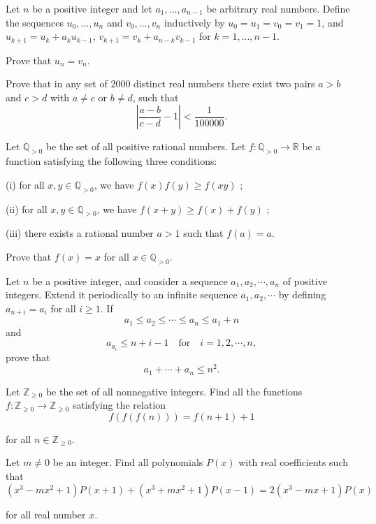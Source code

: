 \item[\textbf{A1.}]
Let 
$n$
 be a positive integer and let 
$a_1, \ldots, a_{n-1} $
 be arbitrary real numbers. Define the sequences 
$u_0, \ldots, u_n $
 and 
$v_0, \ldots, v_n $
 inductively by 
$u_0 = u_1  = v_0 = v_1 = 1$, 
 and 
$u_{k+1} = u_k + a_k u_{k-1}$, 
$v_{k+1} = v_k + a_{n-k} v_{k-1}$
 for 
$k=1, \ldots, n-1.$


Prove that 
$u_n = v_n.$

\item[\textbf{A2.}]
Prove that in any set of 
$2000$
 distinct real numbers there exist two pairs 
$a>b$
 and 
$c>d$
 with 
$a \neq c$
 or 
$b \neq d $, 
 such that  
\[ \left| \frac{a-b}{c-d} - 1 \right|< \frac{1}{100000}. \]

\item[\textbf{A3.}]
Let 
$\mathbb Q_{>0}$
 be the set of all positive rational numbers. Let 
$f:\mathbb Q_{>0}\to\mathbb R$
 be a function satisfying the following three conditions:


(i) for all 
$x,y\in\mathbb Q_{>0}$, 
 we have 
$f(x)f(y)\geq f(xy)$
;


(ii) for all 
$x,y\in\mathbb Q_{>0}$, 
 we have 
$f(x+y)\geq f(x)+f(y)$
;


(iii) there exists a rational number 
$a>1$
 such that 
$f(a)=a$.


Prove that 
$f(x)=x$
 for all 
$x\in\mathbb Q_{>0}$.

\item[\textbf{A4.}]
Let 
$n$
 be a positive integer, and consider a sequence 
$a_1 , a_2 , \cdots , a_n $
 of positive integers. Extend it periodically to an infinite sequence 
$a_1 , a_2 , \cdots $
 by defining 
$a_{n+i} = a_i $
 for all 
$i \ge 1$.
 If 
\[a_1 \le a_2 \le \cdots \le a_n \le a_1 +n  \]
 and 
\[a_{a_i } \le n+i-1 \quad\text{for}\quad i=1,2,\cdots, n, \]
 prove that 
\[a_1 + \cdots +a_n \le n^2. \]

\item[\textbf{A5.}]
Let 
$\mathbb{Z}_{\ge 0}$
 be the set of all nonnegative integers. Find all the functions 
$f: \mathbb{Z}_{\ge 0} \rightarrow \mathbb{Z}_{\ge 0} $
 satisfying the relation
\[ f(f(f(n))) = f(n+1 ) +1 \]


for all 
$ n\in \mathbb{Z}_{\ge 0}$.

\item[\textbf{A6.}]
Let 
$m \neq 0 $
 be an integer. Find all polynomials 
$P(x) $
 with real coefficients such that
\[ (x^3 - mx^2 +1 ) P(x+1)  + (x^3+mx^2+1) P(x-1) =2(x^3 - mx +1 ) P(x) \]


for all real number 
$x$.

